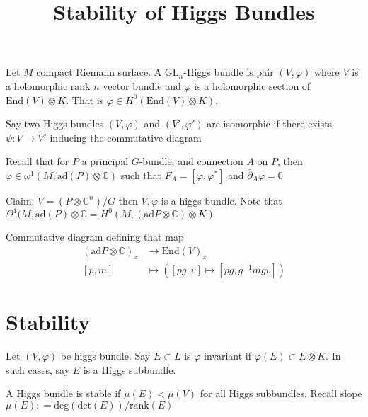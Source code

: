 % 


\title{Stability of Higgs Bundles}
\author{}
\date{}

 
\maketitle

\begin{definition}
Let $M$ compact Riemann surface. 
    A $\mathrm{GL}_n $-Higgs bundle is pair $(V, \varphi)$ 
    where $ V$ is a holomorphic rank $n$ vector bundle and 
    $ \varphi$ is a holomorphic section of $ \mathrm{End}(V) \otimes K $.
    That is $ \varphi \in H^0 ( \mathrm{End} (V) \otimes K) $.
\end{definition}

\begin{definition}
    Say two Higgs bundles $(V, \varphi) $ and $(V', \varphi')$ are isomorphic if 
    there exists $ \psi: V \rightarrow  V'$ inducing the commutative diagram
\end{definition}

Recall that for $P$ a principal $G$-bundle, 
and connection $A$ on $P$, 
then $ \varphi \in \omega^1 ( M , \mathrm{ad} ( P) \otimes \mathbb{C} ) $ 
such that $ F_ A = [ \varphi , \varphi ^* ] $ and $ \bar{\partial} _A \varphi = 0 $

Claim: $ V = (P \otimes \mathbb{C} ^n) / G $ then $V, \varphi$ is a higgs bundle. 
Note that $ \Omega^1 ( M, \mathrm{ad} ( P) \otimes \mathbb{C}  = H^0 ( M , ( \mathrm{ad} P \otimes \mathbb{C} ) \otimes K) $

Commutative diagram defining that map 
\begin{align}
    (\mathrm{ad}P \otimes \mathbb{C} )_x & \rightarrow  \mathrm{End}(V) _x \\
    [p, m ] & \mapsto ([pg, v] \mapsto [pg, g^{-1} m g v] ) 
\end{align}


\section{Stability} %

\begin{definition}
    Let $( V, \varphi) $ be higgs bundle. 
    Say $ E \subset L$ is $ \varphi$ invariant if $ \varphi(E) \subset E \otimes K$. 
    In such cases, say $E$ is a Higgs subbundle. 

    A Higgs bundle is stable if $\mu(E) < \mu(V) $ for all Higgs subbundles. 
    Recall slope $ \mu(E) : = \mathrm{deg} ( \mathrm{det}(E)) / \mathrm{rank}(E) $ 
\end{definition}

